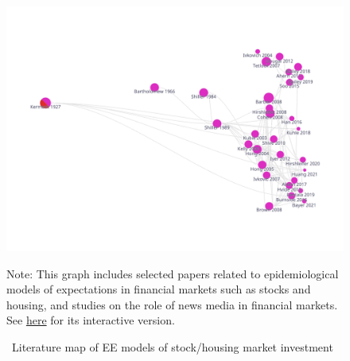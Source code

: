 \newpage

\begin{figure}[!ht] \centering  %
	\caption{ ~Literature map of EE models of stock/housing market investment}
	\label{fig:graph_investment}
	\centerline{\includegraphics[width=\textwidth]{./figures/graph_investment}}
			\begin{flushleft}
	{\footnotesize Note: This graph includes selected papers related to epidemiological models of expectations in financial markets such as stocks and housing, and studies on the role of news media in financial markets. See \href{https://app.litmaps.co/shared/E25276CA-8725-437B-8241-11961EFB3FB4}{here} for its interactive version.}
					\end{flushleft}
\end{figure}

\newpage



